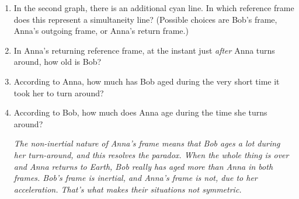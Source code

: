 \begin{enumerate}[wide]
\item In the second graph, there is an additional cyan line. In which reference frame does this represent a simultaneity line?  (Possible choices are Bob's frame, Anna's outgoing frame, or Anna's return frame.)
\answerspace{0.8in}

\item In Anna's returning reference frame, at the instant just \textit{after} Anna turns around, how old is Bob?  
\answerspace{0.8in}

\item According to Anna, how much has Bob aged during the very short time it took her to turn around?
\answerspace{0.8in}

\item According to Bob, how much does Anna age during the time she turns around?
\answerspace{0.8in}

\textit{The non-inertial nature of Anna's frame means that Bob ages a lot during her turn-around, and this resolves the paradox.  When the whole thing is over and Anna returns to Earth, Bob really has aged more than Anna in both frames.  Bob's frame is inertial, and Anna's frame is not, due to her acceleration.  That's what makes their situations not symmetric.}



\end{enumerate}
